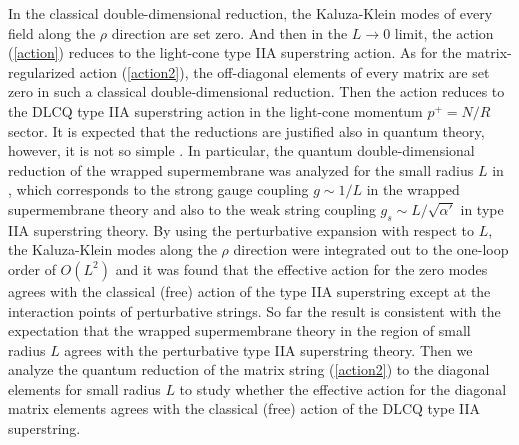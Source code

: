 \documentclass[a4paper,12pt]{article}
\begin{document}
In the classical double-dimensional reduction, the Kaluza-Klein modes
of every field along the $\rho$ direction are set zero.
And then in the $L\to0$ limit, the action (\ref{action}) reduces to
the light-cone type IIA superstring action.
As for the matrix-regularized action (\ref{action2}),
the off-diagonal elements of every matrix are set zero in such a
classical double-dimensional reduction.
Then the action reduces to the DLCQ type IIA superstring action
in the light-cone momentum $p^+=N/R$ sector.
It is expected that the reductions are justified also in quantum
theory, however, it is not so simple \cite{Rus,SY}.
In particular, the quantum double-dimensional reduction of the wrapped
supermembrane was analyzed for the small radius $L$ in \cite{SY},
which corresponds to the strong gauge coupling $g\sim 1/L$ in the
wrapped supermembrane theory and also to the weak string coupling
$g_s\sim L/\sqrt{\alpha'}$ in type IIA superstring theory.
By using the perturbative expansion with respect to $L$, the
Kaluza-Klein modes along the $\rho$ direction were integrated out to
the one-loop order of $O(L^2)$ and it was found that the effective
action for the zero modes agrees with the classical (free) action of
the type IIA superstring except at the interaction points of
perturbative strings.
So far the result is consistent with the expectation that the wrapped
supermembrane theory in the region of small radius $L$ agrees with
the perturbative type IIA superstring theory.
Then we analyze the quantum reduction of the matrix string
(\ref{action2}) to the diagonal elements for small radius $L$
to study whether the effective action for the diagonal matrix elements
agrees with the classical (free) action of the DLCQ type IIA
superstring.

\end{document}
